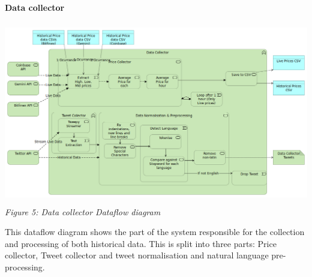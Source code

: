 \documentclass[oneside, 12pt]{article}
\begin{document}
		\textbf{Data collector}
		\begin{center}
			\includegraphics[width=15cm,height=8cm]{images/Data_Collector.png}
			\textit{Figure 5: Data collector Dataflow diagram}
		\end{center}
		This dataflow diagram shows the part of the system responsible for the collection and processing of both historical data. This is split into three parts: Price collector, Tweet collector and tweet normalisation and natural language pre-processing.
\end{document}
